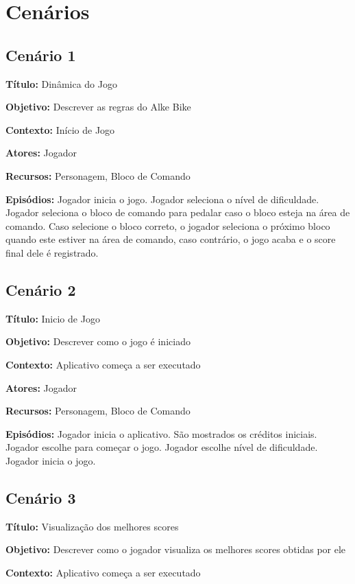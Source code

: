 \section{Cenários}
\subsection{Cenário 1}

\textbf{Título:} Dinâmica do Jogo 

\textbf{Objetivo:} Descrever as regras do Alke Bike 

\textbf{Contexto:} Início de Jogo

\textbf{Atores:} Jogador

\textbf{Recursos:} Personagem, Bloco de Comando

\textbf{Episódios:} Jogador inicia o jogo. Jogador seleciona o nível de dificuldade. Jogador seleciona o bloco de comando para pedalar caso o bloco esteja na área de comando. Caso selecione o bloco correto, o jogador seleciona o próximo bloco quando este estiver na área de comando, caso contrário, o jogo acaba e o score final dele é registrado.

\subsection{Cenário 2}

\textbf{Título:} Inicio de Jogo

\textbf{Objetivo:} Descrever como o jogo é iniciado 

\textbf{Contexto:} Aplicativo começa a ser executado 

\textbf{Atores:} Jogador

\textbf{Recursos:} Personagem, Bloco de Comando

\textbf{Episódios:} Jogador inicia o aplicativo. São mostrados os créditos iniciais. Jogador escolhe para começar o jogo. Jogador escolhe nível de dificuldade. Jogador inicia o jogo.

\subsection{Cenário 3}

\textbf{Título:} Visualização dos melhores scores

\textbf{Objetivo:} Descrever como o jogador visualiza os melhores scores obtidas por ele

\textbf{Contexto:} Aplicativo começa a ser executado


